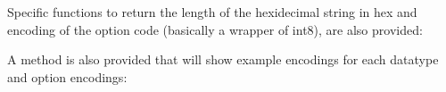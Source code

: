 \documentclass[letterpaper,10pt,english]{sphinxmanual}
\begin{document}
\sphinxAtStartPar
Specific functions to return the length of the hexidecimal string in hex and
encoding of the option code (basically a wrapper of int8), are also provided:

\begin{sphinxVerbatim}[commandchars=\\\{\}]
  
\end{sphinxVerbatim}

\sphinxAtStartPar
A  method is also provided that will show example encodings
for each data\sphinxhyphen{}type and option encodings:
\end{document}
